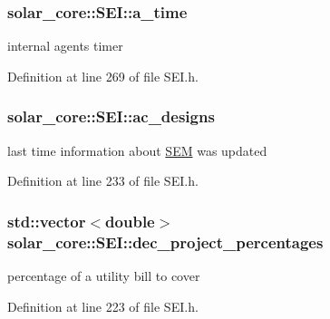 \subsubsection[{a\+\_\+time}]{ solar\+\_\+core\+::\+S\+E\+I\+::a\+\_\+time\hspace{0.3cm}{\ttfamily [protected]}}\label{classsolar__core_1_1_s_e_i_abf17b36abf722993d5ad53710579d402}
internal agent\textquotesingle{}s timer 

Definition at line 269 of file S\+E\+I.\+h.

\hypertarget{classsolar__core_1_1_s_e_i_a147ec60ca551d9195cdf5937eda5f903}{}
\subsubsection[{ac\+\_\+designs}]{ solar\+\_\+core\+::\+S\+E\+I\+::ac\+\_\+designs\hspace{0.3cm}{\ttfamily [protected]}}\label{classsolar__core_1_1_s_e_i_a147ec60ca551d9195cdf5937eda5f903}
last time information about \hyperlink{classsolar__core_1_1_s_e_m}{S\+E\+M} was updated 

Definition at line 233 of file S\+E\+I.\+h.

\hypertarget{classsolar__core_1_1_s_e_i_a272838ea17b8cd4e49c9a8c53facfd8f}{}
\subsubsection[{dec\+\_\+project\+\_\+percentages}]{\setlength{\rightskip}{0pt plus 5cm}std\+::vector$<$double$>$ solar\+\_\+core\+::\+S\+E\+I\+::dec\+\_\+project\+\_\+percentages\hspace{0.3cm}{\ttfamily [protected]}}\label{classsolar__core_1_1_s_e_i_a272838ea17b8cd4e49c9a8c53facfd8f}
percentage of a utility bill to cover 

Definition at line 223 of file S\+E\+I.\+h.

\hypertarget{classsolar__core_1_1_s_e_i_a79728143af5752e09c2be29cfa1cfd8f}{}
